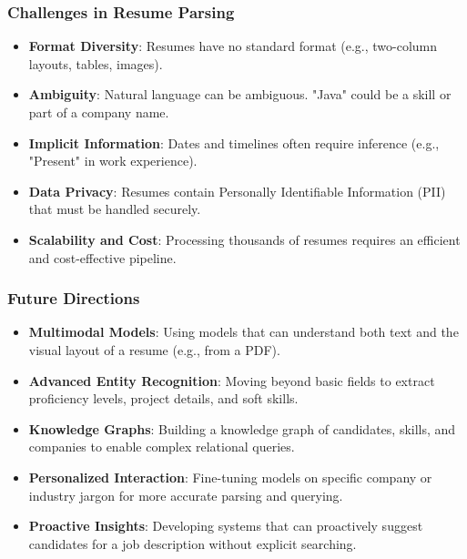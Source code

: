 \begin{frame}[fragile]\frametitle{Challenges in Resume Parsing}
    \begin{itemize}
        \item \textbf{Format Diversity}: Resumes have no standard format (e.g., two-column layouts, tables, images).
        \item \textbf{Ambiguity}: Natural language can be ambiguous. "Java" could be a skill or part of a company name.
        \item \textbf{Implicit Information}: Dates and timelines often require inference (e.g., "Present" in work experience).
        \item \textbf{Data Privacy}: Resumes contain Personally Identifiable Information (PII) that must be handled securely.
        \item \textbf{Scalability and Cost}: Processing thousands of resumes requires an efficient and cost-effective pipeline.
    \end{itemize}
\end{frame}

\begin{frame}[fragile]\frametitle{Future Directions}
    \begin{itemize}
        \item \textbf{Multimodal Models}: Using models that can understand both text and the visual layout of a resume (e.g., from a PDF).
        \item \textbf{Advanced Entity Recognition}: Moving beyond basic fields to extract proficiency levels, project details, and soft skills.
        \item \textbf{Knowledge Graphs}: Building a knowledge graph of candidates, skills, and companies to enable complex relational queries.
        \item \textbf{Personalized Interaction}: Fine-tuning models on specific company or industry jargon for more accurate parsing and querying.
        \item \textbf{Proactive Insights}: Developing systems that can proactively suggest candidates for a job description without explicit searching.
    \end{itemize}
\end{frame}

